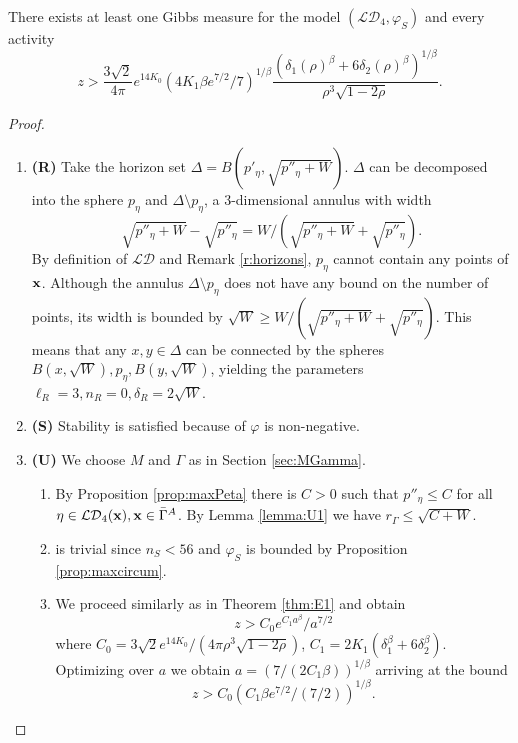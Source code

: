 \begin{theorem}\label{thm:E3}
	There exists at least one Gibbs measure for the model $(\mathcal {LD}_4,\varphi_S)$ and every activity 
	$$z> \frac{3\sqrt 2}{4\pi}e^{14 K_0}   (4K_1 \beta e^{7/2}/7)^{1/\beta} \frac{(\delta_1(\rho)^\beta + 6\delta_2(\rho)^\beta)^{1/\beta}}{\rho^3 \sqrt{1-2\rho}}.$$
\end{theorem}
\begin{proof}
\begin{enumerate}[]
	\item \textbf{(R)} Take the horizon set $\Delta = B(p'_\eta, \sqrt{p''_\eta + W})$. $\Delta$ can be decomposed into the sphere $p_\eta$ and $\Delta \setminus p_\eta$, a 3-dimensional annulus with width 
		$$\sqrt{p''_\eta+W} -\sqrt{p''_\eta}=W/(\sqrt{p''_\eta+W} + \sqrt{p''_\eta}).$$
		By definition of $\mathcal {LD}$ and Remark \ref{r:horizons}, $p_\eta$  cannot contain any points of ${\mathbf{x}}$. Although the annulus $\Delta \setminus p_\eta$ does not have any bound on the number of points, its width is bounded by $\sqrt W \geq  W/(\sqrt{p''_\eta+W} + \sqrt{p''_\eta})$. This means that any $x,y\in \Delta$ can be connected by the spheres $B(x,\sqrt W), p_\eta, B(y,\sqrt W)$, yielding the parameters $\ell_R = 3,n_R=0,\delta_R=2\sqrt W$.
	\item \textbf{(S)} Stability is satisfied because of $\varphi$ is non-negative.
	\item \textbf{(U)} We choose $M$ and $\Gamma$ as in Section \ref{sec:MGamma}.
		\begin{enumerate}[(U1)]
			\item By Proposition \ref{prop:maxPeta} there is $C>0$ such that $p''_\eta\leq C$ for all $\eta \in \mathcal {LD}_4({\mathbf{x}}), {\mathbf{x}} \in \bar\Gamma^A$. By Lemma \ref{lemma:U1} we have $r_\Gamma\leq \sqrt{C + W}$.
			\item is trivial since $n_S<56$ and $\varphi_{S}$ is bounded by Proposition \ref{prop:maxcircum}.
			\item We proceed similarly as in Theorem \ref{thm:E1} and obtain
				$$z>C_0 e^{C_1 a^\beta} / a^{7/2}$$
				where $C_0=3 \sqrt 2 e^{14K_0} / (4\pi \rho^3 \sqrt{1-2\rho})$, $C_1 = 2K_1(\delta_1^\beta + 6\delta_2^\beta)$. Optimizing over $a$ we obtain $a=(7/(2C_1\beta))^{1/\beta}$ arriving at the bound
				$$z> C_0 (C_1 \beta e^{7/2} / (7/2))^{1/\beta}.$$
		\end{enumerate}
\end{enumerate}
\end{proof}



